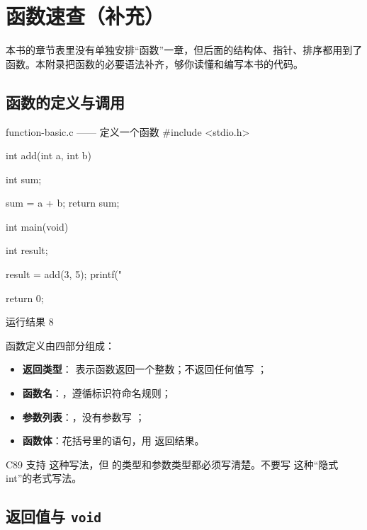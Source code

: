 \chapter{函数速查（补充）}
\label{app:function}

本书的章节表里没有单独安排“函数”一章，但后面的结构体、指针、排序都用到了函数。本附录把函数的必要语法补齐，够你读懂和编写本书的代码。

\section{函数的定义与调用}

\begin{codebox}{function-basic.c —— 定义一个函数}
#include <stdio.h>

int add(int a, int b)
{
    int sum;

    sum = a + b;
    return sum;
}

int main(void)
{
    int result;

    result = add(3, 5);
    printf("%

    return 0;
}
\end{codebox}

\begin{outbox}{运行结果}
8
\end{outbox}

函数定义由四部分组成：

\begin{itemize}
  \item \textbf{返回类型}： 表示函数返回一个整数；不返回任何值写 ；
  \item \textbf{函数名}：，遵循标识符命名规则；
  \item \textbf{参数列表}：，没有参数写 ；
  \item \textbf{函数体}：花括号里的语句，用  返回结果。
\end{itemize}

\begin{pitfall}[C89 的参数声明]
C89 支持  这种写法，但  的类型和参数类型都必须写清楚。不要写  这种“隐式 int”的老式写法。
\end{pitfall}

\section{返回值与 \texttt{void}}

